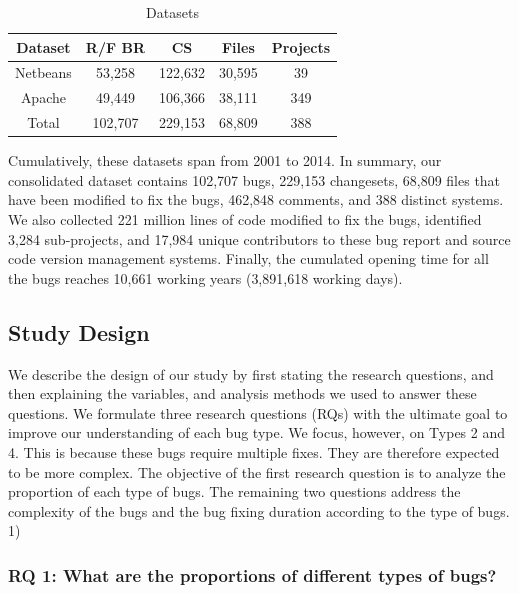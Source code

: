 \begin{table}[h]
\begin{center}
\begin{tabular}{@{}c|c|c|c|c@{}}
\textbf{Dataset} & \textbf{R/F BR} & \textbf{CS} & \textbf{Files} & \textbf{Projects} \\ \hline \hline
Netbeans         & 53,258          & 122,632     & 30,595         & 39                \\
Apache           & 49,449          & 106,366     & 38,111         & 349               \\
Total            & 102,707         & 229,153     & 68,809         & 388               \\ \hline \hline

\end{tabular}
\end{center}

\caption{Datasets\label{table:datasets}}
\end{table}

Cumulatively, these datasets span from 2001 to 2014. In
summary, our consolidated dataset contains 102,707 bugs,
229,153 changesets, 68,809 files that have been modified to
fix the bugs, 462,848 comments, and 388 distinct systems.
We also collected 221 million lines of code modified to fix
the bugs, identified 3,284 sub-projects, and 17,984 unique
contributors to these bug report and source code version
management systems. Finally, the cumulated opening time for
all the bugs reaches 10,661 working years (3,891,618
working days).

\subsection{Study Design}

We describe the design of our study by first stating the
research questions, and then explaining the variables, and
analysis methods we used to answer these questions. We
formulate three research questions (RQs) with the ultimate
goal to improve our understanding of each bug type. We
focus, however, on Types 2 and 4. This is because these bugs
require multiple fixes. They are therefore expected to be more
complex.
The objective of the first research question is to analyze
the proportion of each type of bugs. The remaining two
questions address the complexity of the bugs and the bug
fixing duration according to the type of bugs.
1) 

\subsubsection{RQ 1: What are the proportions of different types of bugs?}

